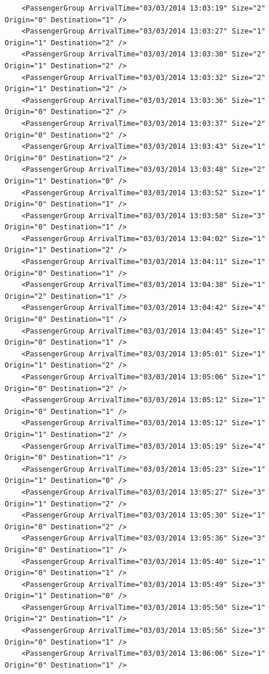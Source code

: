 \documentclass{UoYCSproject}
\begin{document}
\begin{appendices}
\begin{lstlisting}
	<PassengerGroup ArrivalTime="03/03/2014 13:03:19" Size="2" Origin="0" Destination="1" />
	<PassengerGroup ArrivalTime="03/03/2014 13:03:27" Size="1" Origin="1" Destination="2" />
	<PassengerGroup ArrivalTime="03/03/2014 13:03:30" Size="2" Origin="1" Destination="2" />
	<PassengerGroup ArrivalTime="03/03/2014 13:03:32" Size="2" Origin="1" Destination="2" />
	<PassengerGroup ArrivalTime="03/03/2014 13:03:36" Size="1" Origin="0" Destination="2" />
	<PassengerGroup ArrivalTime="03/03/2014 13:03:37" Size="2" Origin="0" Destination="2" />
	<PassengerGroup ArrivalTime="03/03/2014 13:03:43" Size="1" Origin="0" Destination="2" />
	<PassengerGroup ArrivalTime="03/03/2014 13:03:48" Size="2" Origin="1" Destination="0" />
	<PassengerGroup ArrivalTime="03/03/2014 13:03:52" Size="1" Origin="0" Destination="1" />
	<PassengerGroup ArrivalTime="03/03/2014 13:03:58" Size="3" Origin="0" Destination="1" />
	<PassengerGroup ArrivalTime="03/03/2014 13:04:02" Size="1" Origin="1" Destination="2" />
	<PassengerGroup ArrivalTime="03/03/2014 13:04:11" Size="1" Origin="0" Destination="1" />
	<PassengerGroup ArrivalTime="03/03/2014 13:04:38" Size="1" Origin="2" Destination="1" />
	<PassengerGroup ArrivalTime="03/03/2014 13:04:42" Size="4" Origin="0" Destination="1" />
	<PassengerGroup ArrivalTime="03/03/2014 13:04:45" Size="1" Origin="0" Destination="1" />
	<PassengerGroup ArrivalTime="03/03/2014 13:05:01" Size="1" Origin="1" Destination="2" />
	<PassengerGroup ArrivalTime="03/03/2014 13:05:06" Size="1" Origin="0" Destination="2" />
	<PassengerGroup ArrivalTime="03/03/2014 13:05:12" Size="1" Origin="0" Destination="1" />
	<PassengerGroup ArrivalTime="03/03/2014 13:05:12" Size="1" Origin="1" Destination="2" />
	<PassengerGroup ArrivalTime="03/03/2014 13:05:19" Size="4" Origin="0" Destination="1" />
	<PassengerGroup ArrivalTime="03/03/2014 13:05:23" Size="1" Origin="1" Destination="0" />
	<PassengerGroup ArrivalTime="03/03/2014 13:05:27" Size="3" Origin="1" Destination="2" />
	<PassengerGroup ArrivalTime="03/03/2014 13:05:30" Size="1" Origin="0" Destination="2" />
	<PassengerGroup ArrivalTime="03/03/2014 13:05:36" Size="3" Origin="0" Destination="1" />
	<PassengerGroup ArrivalTime="03/03/2014 13:05:40" Size="1" Origin="0" Destination="1" />
	<PassengerGroup ArrivalTime="03/03/2014 13:05:49" Size="3" Origin="1" Destination="0" />
	<PassengerGroup ArrivalTime="03/03/2014 13:05:50" Size="1" Origin="2" Destination="1" />
	<PassengerGroup ArrivalTime="03/03/2014 13:05:56" Size="3" Origin="0" Destination="1" />
	<PassengerGroup ArrivalTime="03/03/2014 13:06:06" Size="1" Origin="0" Destination="1" />

\end{lstlisting}
\end{appendices}
\end{document}
